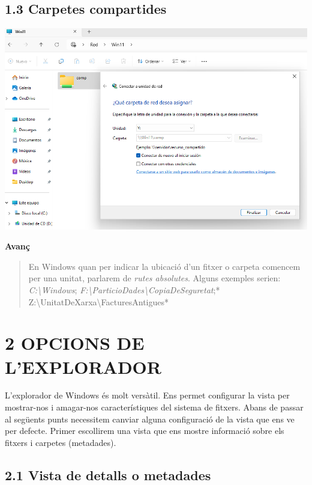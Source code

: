 \documentclass[
  a4paper,
]{article}
\begin{document}
\subsection{1.3 Carpetes compartides}\label{carpetes-compartides}

\includegraphics{png/conectarUnitat.png}

\textbf{Avanç}

\begin{quote}
En Windows quan per indicar la ubicació d'un fitxer o carpeta comencem
per una unitat, parlarem de \emph{rutes absolutes}. Alguns exemples
serien: \emph{C:\textbackslash Windows};
\emph{F:\textbackslash ParticioDades\textbackslash CopiaDeSeguretat};*
Z:\textbackslash UnitatDeXarxa\textbackslash FacturesAntigues*
\end{quote}

\section{2 OPCIONS DE L'EXPLORADOR}\label{opcions-de-lexplorador}

L'explorador de Windows és molt versàtil. Ens permet configurar la vista
per mostrar-nos i amagar-nos característiques del sistema de fitxers.
Abans de passar al següents punts necessitem canviar alguna configuració
de la vista que ens ve per defecte. Primer escollirem una vista que ens
mostre informació sobre els fitxers i carpetes (metadades).

\subsection{2.1 Vista de detalls o
metadades}\label{vista-de-detalls-o-metadades}
\end{document}
